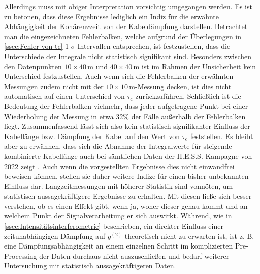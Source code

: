 Allerdings muss mit obiger Interpretation vorsichtig umgegangen werden. 
Es ist zu betonen, dass diese Ergebnisse lediglich ein Indiz für die erwähnte Abhängigkeit der Kohärenzzeit von der Kabeldämpfung darstellen. 
Betrachtet man die eingezeichneten Fehlerbalken, welche aufgrund der Überlegungen in \autoref{ssec:Fehler von tc} 1-$\sigma$-Intervallen entsprechen, ist festzustellen, dass die Unterschiede der Integrale nicht statistisch signifikant sind. 
Besonders zwischen den Datenpunkten $10\times 40\,\mathrm{m}$ und $40\times 40\,\mathrm{m}$ ist im Rahmen der Unsicherheit kein Unterschied festzustellen. 
Auch wenn sich die Fehlerbalken der erwähnten Messungen zudem nicht mit der $10\times 10\,\mathrm{m}$-Messung decken, ist dies nicht automatisch auf einen Unterschied von $\tau_{\mathrm{c}}$ zurückzuführen. 
Schließlich ist die Bedeutung der Fehlerbalken vielmehr, dass jeder aufgetragene Punkt bei einer Wiederholung der Messung in etwa 32\% der Fälle außerhalb der Fehlerbalken liegt. 
Zusammenfassend lässt sich also kein statistisch signifikanter Einfluss der Kabellänge bzw. Dämpfung der Kabel auf den Wert von $\tau_{\mathrm{c}}$ feststellen. 
Es bleibt aber zu erwähnen, dass sich die Abnahme der Integralwerte für steigende kombinierte Kabellänge auch bei sämtlichen Daten der H.E.S.S.-Kampagne von 2022 zeigt \cite{zmijaFirstIntensityInterferometry2023}. 
Auch wenn die vorgestellten Ergebnisse dies nicht einwandfrei beweisen können, stellen sie daher weitere Indize für einen bisher unbekannten Einfluss dar. 
Langzeitmessungen mit höherer Statistik sind vonnöten, um statistisch aussagekräftigere Ergebnisse zu erhalten. 
Mit diesen ließe sich besser verstehen, ob es einen Effekt gibt, wenn ja, woher dieser genau kommt und an welchem Punkt der Signalverarbeitung er sich auswirkt. 
Während, wie in \autoref{ssec:Intensitätsinterferometrie} beschrieben, ein direkter Einfluss einer zeitunabhängigen Dämpfung auf $g^{(2)}$ theoretisch nicht zu erwarten ist, ist z. B. eine Dämpfungsabhängigkeit an einem einzelnen Schritt im komplizierten Pre-Processing der Daten durchaus nicht auszuschließen und bedarf weiterer Untersuchung mit statistisch aussagekräftigeren Daten. \\

